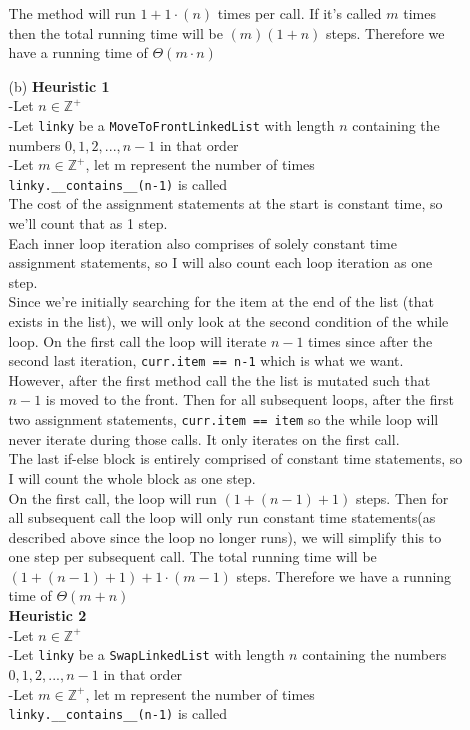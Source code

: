 \documentclass[fontsize=11pt]{article}
\begin{document}
\begin{enumerate}
\begin{enumerate}
    The method will run $1 + 1\cdot(n)$ times per call. If it's called $m$ times then the total running time will be $(m)(1+n)$ steps. Therefore we have a running time of $\Theta(m \cdot n)$ \\

    \item[(b)]
    \textbf{Heuristic 1}\\
    -Let $n \in \mathbb{Z}^+$ \\
    -Let \texttt{linky} be a \texttt{MoveToFrontLinkedList} with length $n$ containing the numbers $0, 1, 2,..., n-1$ in that order \\
    -Let $m \in \mathbb{Z}^+$, let m represent the number of times \texttt{linky.\_\_contains\_\_(n-1)} is called \\

    The cost of the assignment statements at the start is constant time, so we'll count that as 1 step.\\

    Each inner loop iteration also comprises of solely constant time assignment statements, so I will also count each loop iteration as one step.\\
    Since we're initially searching for the item at the end of the list (that exists in the list), we will only look at the second condition of the while loop. On the first call the loop will iterate $n-1$ times since after the second last iteration, \texttt{curr.item == n-1} which is what we want.\\
    However, after the first method call the the list is mutated such that $n-1$ is moved to the front. Then for all subsequent loops, after the first two assignment statements, \texttt{curr.item == item} so the while loop will never iterate during those calls. It only iterates on the first call. \\

    The last if-else block is entirely comprised of constant time statements, so I will count the whole block as one step.\\

    On the first call, the loop will run $(1+(n-1)+1)$ steps. Then for all subsequent call the loop will only run constant time statements(as described above since the loop no longer runs), we will simplify this to one step per subsequent call. The total running time will be $(1+(n-1)+1) + 1 \cdot (m-1)$ steps. Therefore we have a running time of $\Theta(m + n)$\\

    \textbf{Heuristic 2}\\
    -Let $n \in \mathbb{Z}^+$ \\
    -Let \texttt{linky} be a \texttt{SwapLinkedList} with length $n$ containing the numbers $0, 1, 2,..., n-1$ in that order \\
    -Let $m \in \mathbb{Z}^+$, let m represent the number of times \texttt{linky.\_\_contains\_\_(n-1)} is called \\


\end{enumerate}
\end{enumerate}
\end{document}
